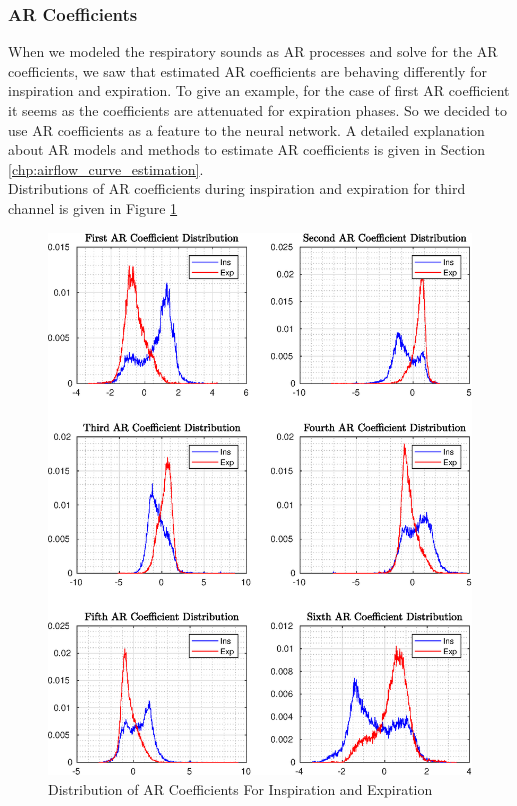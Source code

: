 \subsubsection{AR Coefficients}
When we modeled the respiratory sounds as AR processes and solve for the AR coefficients, we saw that estimated AR coefficients are behaving differently for inspiration and expiration. To give an example, for the case of first AR coefficient it seems as the coefficients are attenuated for expiration phases. So we decided to use  AR coefficients as a feature to the neural network. A detailed explanation about AR models and methods to estimate AR coefficients is given in Section \ref{chp:airflow_curve_estimation}. \\ Distributions of AR coefficients during inspiration and expiration for third channel is given in Figure \ref{fig:arall_ins_exp}
\begin{figure}[h!]
	\begin{center}
		\includegraphics[width=\textwidth]{figures/arall_ins_exp.eps}
		\caption{Distribution of AR Coefficients For Inspiration and Expiration}
		\label{fig:arall_ins_exp}
	\end{center}
\end{figure}
